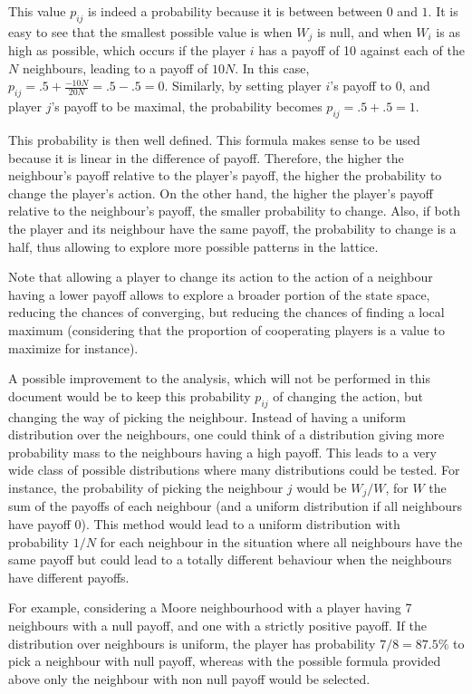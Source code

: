 \documentclass{article}
\begin{document}
This value $p_{ij}$ is indeed a probability because it is between between $0$ and $1$. It is easy to see
that the smallest possible value is when $W_j$ is null, and when $W_i$ is as high as possible, which occurs
if the player $i$ has a payoff of 10 against each of the $N$ neighbours, leading to a payoff of $10N$.
In this case, $p_{ij} = .5 + \frac {-10N}{20N} = .5 - .5 = 0$. Similarly, by setting player $i$'s payoff to 0,
and player $j$'s payoff to be maximal, the probability becomes $p_{ij} = .5 + .5 = 1$.

This probability is then well defined. This formula makes sense to be used because it is linear in the difference
of payoff. Therefore, the higher the neighbour's payoff relative to the player's payoff, the higher the
probability to change the player's action. On the other hand, the higher the player's payoff relative to the
neighbour's payoff, the smaller probability to change. Also, if both the player and its neighbour have the same
payoff, the probability to change is a half, thus allowing to explore more possible patterns in the lattice.

Note that allowing a player to change its action to the action of a neighbour having a lower payoff allows
to explore a broader portion of the state space, reducing the chances of converging, but reducing the chances
of finding a local maximum (considering that the proportion of cooperating players is a value to maximize for
instance).

A possible improvement to the analysis, which will not be performed in this document would be to keep this
probability $p_{ij}$ of changing the action, but changing the way of picking the neighbour. Instead of having
a uniform distribution over the neighbours, one could think of a distribution giving more probability mass
to the neighbours having a high payoff. This leads to a very wide class of possible distributions where
many distributions could be tested. For instance, the probability of picking the neighbour $j$ would be
$W_j/W$, for $W$ the sum of the payoffs of each neighbour (and a uniform distribution if all neighbours
have payoff 0). This method would lead to a uniform distribution with probability $1/N$ for each neighbour
in the situation where all neighbours have the same payoff but could lead to a totally different behaviour
when the neighbours have different payoffs.

For example, considering a Moore neighbourhood with a player having 7 neighbours with a null payoff, and
one with a strictly positive payoff. If the distribution over neighbours is uniform, the player has
probability $7/8 = 87.5\%$ to pick a neighbour with null payoff, whereas with the possible formula
provided above only the neighbour with non null payoff would be selected.
\end{document}
